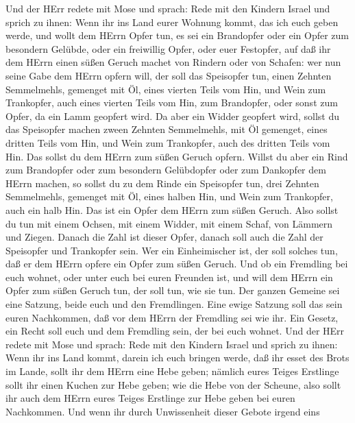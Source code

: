  Und der HErr redete mit Mose und sprach:  Rede
mit den Kindern Israel und sprich zu ihnen: Wenn ihr ins Land eurer
Wohnung kommt, das ich euch geben werde,  und wollt dem
HErrn Opfer tun, es sei ein Brandopfer oder ein Opfer zum besondern
Gelübde, oder ein freiwillig Opfer, oder euer Festopfer, auf daß ihr dem
HErrn einen süßen Geruch machet von Rindern oder von Schafen:
 wer nun seine Gabe dem HErrn opfern will, der soll das
Speisopfer tun, einen Zehnten Semmelmehls, gemenget mit Öl, eines
vierten Teils vom Hin,  und Wein zum Trankopfer, auch eines
vierten Teils vom Hin, zum Brandopfer, oder sonst zum Opfer, da ein Lamm
geopfert wird.  Da aber ein Widder geopfert wird, sollst du
das Speisopfer machen zween Zehnten Semmelmehls, mit Öl gemenget, eines
dritten Teils vom Hin,  und Wein zum Trankopfer, auch des
dritten Teils vom Hin. Das sollst du dem HErrn zum süßen Geruch opfern.
 Willst du aber ein Rind zum Brandopfer oder zum besondern
Gelübdopfer oder zum Dankopfer dem HErrn machen,  so sollst
du zu dem Rinde ein Speisopfer tun, drei Zehnten Semmelmehls, gemenget
mit Öl, eines halben Hin,  und Wein zum Trankopfer, auch
ein halb Hin. Das ist ein Opfer dem HErrn zum süßen Geruch.
 Also sollst du tun mit einem Ochsen, mit einem Widder, mit
einem Schaf, von Lämmern und Ziegen.  Danach die Zahl ist
dieser Opfer, danach soll auch die Zahl der Speisopfer und Trankopfer
sein.  Wer ein Einheimischer ist, der soll solches tun, daß
er dem HErrn opfere ein Opfer zum süßen Geruch.  Und ob ein
Fremdling bei euch wohnet, oder unter euch bei euren Freunden ist, und
will dem HErrn ein Opfer zum süßen Geruch tun, der soll tun, wie sie
tun.  Der ganzen Gemeine sei eine Satzung, beide euch und
den Fremdlingen. Eine ewige Satzung soll das sein euren Nachkommen, daß
vor dem HErrn der Fremdling sei wie ihr.  Ein Gesetz, ein
Recht soll euch und dem Fremdling sein, der bei euch wohnet.
 Und der HErr redete mit Mose und sprach: 
Rede mit den Kindern Israel und sprich zu ihnen: Wenn ihr ins Land
kommt, darein ich euch bringen werde,  daß ihr esset des
Brots im Lande, sollt ihr dem HErrn eine Hebe geben; 
nämlich eures Teiges Erstlinge sollt ihr einen Kuchen zur Hebe geben;
wie die Hebe von der Scheune,  also sollt ihr auch dem
HErrn eures Teiges Erstlinge zur Hebe geben bei euren Nachkommen.
 Und wenn ihr durch Unwissenheit dieser Gebote irgend eins

